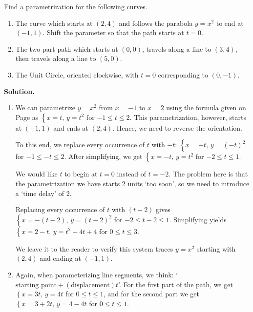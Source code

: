 \documentclass{ximera}
\begin{document}
\begin{example} \label{adjustparametricex}  Find a parametrization for the following curves.

\begin{enumerate}

\item The curve which starts at $(2,4)$ and follows the parabola $y = x^2$ to end at $(-1,1)$.  Shift the parameter so that the path starts at $t=0$.

\item The two part path which starts at $(0,0)$, travels along a line to $(3,4)$, then travels along a line to $(5,0)$. 

\item  \label{adjustcircleex} The Unit Circle, oriented clockwise, with $t=0$ corresponding to $(0,-1)$.


\end{enumerate}

{\bf Solution.}  $~$

\begin{enumerate}

\item  We can parametrize $y = x^2$ from $x=-1$ to $x=2$ using the formula given on Page \pageref{commonparametrizations} as $\left\{x = t, \, y = t^2 \right.$ for $-1 \leq t \leq 2$.  This parametrization, however, starts at $(-1,1)$ and ends at $(2,4)$.  Hence, we need to reverse the orientation. 

 

To this end, we replace every occurrence of $t$ with $-t$:  $\left\{x = -t, \, y = (-t)^2 \right.$ for $-1 \leq -t \leq 2$.  After simplifying, we get  $\left\{x = -t, \, y = t^2 \right.$ for $-2 \leq t \leq 1$. 

 

 We would like $t$ to begin at $t=0$ instead of $t=-2$. The problem here is that the parametrization we have  starts $2$ units `too soon', so we need to introduce a `time delay' of $2$.  
 
  
 
 Replacing every occurrence of $t$ with $(t-2)$ gives $\left\{x = -(t-2), \, y =(t-2) ^2 \right.$ for  $-2 \leq t -2 \leq 1$.  Simplifying yields $\left\{x = 2-t, \, y =t^2-4t+4\right.$ for $0 \leq t  \leq 3$.
 
  
 
 We leave it to the reader to verify this system traces $y = x^2$ starting with $(2,4)$ and ending at $(-1,1)$.

\item  Again, when parameterizing line segments, we think: `$\text{starting point} + (\text{displacement})t$'.  For the first part of the path, we get $\left\{ x = 3t, \, y = 4t \right.$ for $0 \leq t \leq 1$, and for the second part we get $\left\{ x = 3 + 2t, \, y = 4 - 4t \right.$ for $0 \leq t \leq 1$. 


\end{enumerate}
\end{example}
\end{document}
